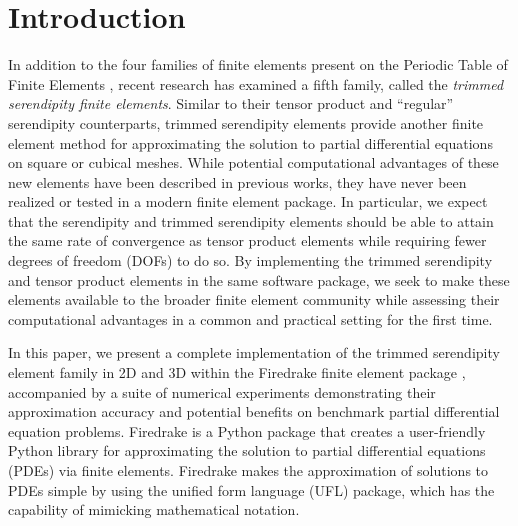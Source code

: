 \documentclass[manuscript,screen]{acmart}
\begin{document}
  
  \maketitle
  
  
  \section{Introduction}
  
  In addition to the four families of finite elements present on the Periodic Table of Finite Elements \cite{arnold2014periodic}, recent research has examined a fifth family, called the \emph{trimmed serendipity finite elements}.  Similar to their tensor product and ``regular'' serendipity counterparts,  trimmed serendipity elements provide another finite element method for approximating the solution to partial differential equations on square or cubical meshes.  While potential computational advantages of these new elements have been described in previous works, they have never been realized or tested in a modern finite element package.  In particular, we expect that the serendipity and trimmed serendipity elements should be able to attain the same rate of convergence as tensor product elements while requiring fewer degrees of freedom (DOFs) to do so.  By implementing the trimmed serendipity and tensor product elements in the same software package, we seek to make these elements available to the broader finite element community while assessing their computational advantages in a common and practical setting for the first time.
  
  
  In this paper, we present a complete implementation of the trimmed serendipity element family in 2D and 3D within the Firedrake finite element package \cite{rathgeber2016firedrake}, accompanied by a suite of numerical experiments demonstrating their approximation accuracy and potential benefits on benchmark partial differential equation problems.
Firedrake is a Python package that creates a user-friendly Python library for approximating the solution to partial differential equations (PDEs) via finite elements. Firedrake makes the approximation of solutions to PDEs simple by using the unified form language (UFL) package, which has the capability of mimicking mathematical notation.  
\end{document}

